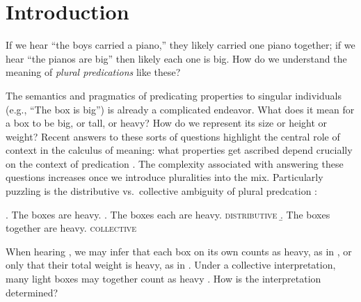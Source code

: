\documentclass[preprint,12pt,authoryear,titlepage]{elsarticle}
\begin{document}


\section{Introduction}

If we hear ``the boys carried a piano,'' they likely carried one piano together; if we hear ``the pianos are big'' then likely each one is big. How do we understand the meaning of \emph{plural predications} like these?

The semantics and pragmatics of predicating properties to singular individuals (e.g., ``The box is big'') is already a complicated endeavor. What does it mean for a box to be big, or tall, or heavy? How do we represent its size or height or weight? Recent answers to these sorts of questions highlight the central role of context in the calculus of meaning: what properties get ascribed depend crucially on the context of predication \citep[cf.~tall for a boy vs.~tall for a basketball player;  e.g.,][]{kennedy1999,lassitergoodman2013}. The complexity associated with answering these questions increases once we introduce pluralities into the mix. 
Particularly puzzling is the distributive vs.~collective ambiguity of plural predcation \citep[e.g.,][]{link1983,link1987,link1998,scha1984,landman1989,landman1989b,landman1996,lasersohn1988,lasersohn1990,lasersohn1995,lasersohn1998,schwarzschild1994,schwarzschild1996}:

\ex. \label{boxes} The boxes are heavy.
\a. \label{boxeseach} The boxes each are heavy. \hfill \textsc{distributive}
\b. \label{boxestogether}The boxes together are heavy. \hfill \textsc{collective}

When hearing \Last, we may infer that each box on its own counts as heavy, as in \Last[a], or only that their total weight is heavy, as in \Last[b]. Under a collective interpretation, many light boxes may together count as heavy \citep{scha1984}.
How is the interpretation determined?
\end{document}
